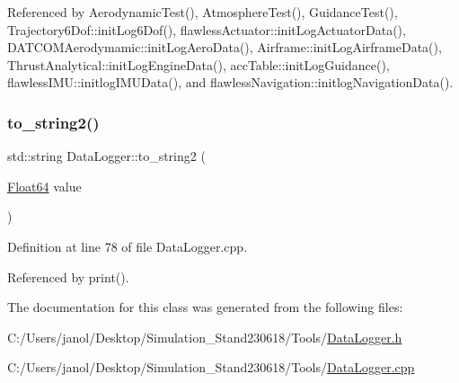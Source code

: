 Referenced by Aerodynamic\+Test(), Atmosphere\+Test(), Guidance\+Test(), Trajectory6\+Dof\+::init\+Log6\+Dof(), flawless\+Actuator\+::init\+Log\+Actuator\+Data(), D\+A\+T\+C\+O\+M\+Aerodymamic\+::init\+Log\+Aero\+Data(), Airframe\+::init\+Log\+Airframe\+Data(), Thrust\+Analytical\+::init\+Log\+Engine\+Data(), acc\+Table\+::init\+Log\+Guidance(), flawless\+I\+M\+U\+::initlog\+I\+M\+U\+Data(), and flawless\+Navigation\+::initlog\+Navigation\+Data().

\mbox{\label{class_data_logger_a04fa995bcb9e7a0868ac748d0506d4e3}} 
\subsubsection{\texorpdfstring{to\+\_\+string2()}{to\_string2()}}
{\footnotesize\ttfamily std\+::string Data\+Logger\+::to\+\_\+string2 (\begin{DoxyParamCaption}\item[{\hyperlink{group___tools_ga3f1431cb9f76da10f59246d1d743dc2c}{Float64}}]{value }\end{DoxyParamCaption})}



Definition at line 78 of file Data\+Logger.\+cpp.



Referenced by print().



The documentation for this class was generated from the following files\+:\begin{DoxyCompactItemize}
\item 
C\+:/\+Users/janol/\+Desktop/\+Simulation\+\_\+\+Stand230618/\+Tools/\hyperlink{_data_logger_8h}{Data\+Logger.\+h}\item 
C\+:/\+Users/janol/\+Desktop/\+Simulation\+\_\+\+Stand230618/\+Tools/\hyperlink{_data_logger_8cpp}{Data\+Logger.\+cpp}\end{DoxyCompactItemize}
